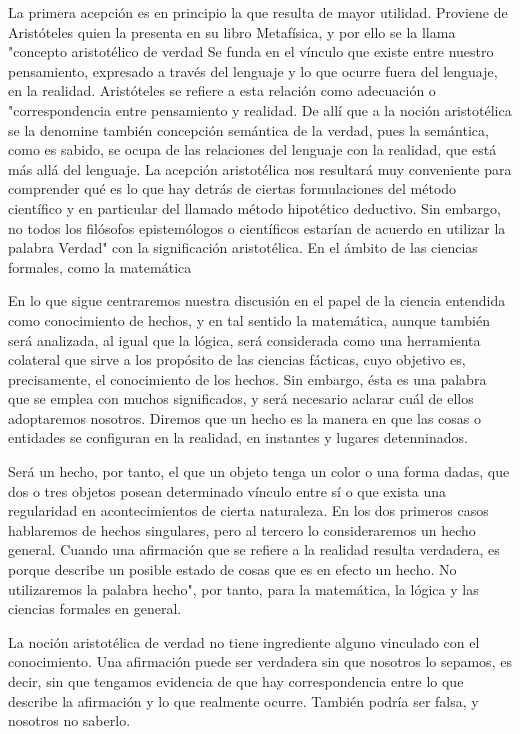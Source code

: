 \documentclass{article}
\begin{document}
La primera acepción es en principio la que resulta de mayor utilidad. Proviene de Aristóteles quien la presenta en su libro Metafísica, y por ello se la llama "concepto aristotélico de verdad Se funda en el vínculo que existe entre nuestro pensamiento, expresado a través del lenguaje y lo que ocurre fuera del lenguaje, en la realidad. Aristóteles se refiere a esta relación como adecuación o "correspondencia entre pensamiento y realidad. De allí que a la noción aristotélica se la denomine también concepción semántica de la verdad, pues la semántica, como es sabido, se ocupa de las relaciones del lenguaje con la realidad, que está más allá del lenguaje. La acepción aristotélica nos resultará muy conveniente para comprender qué es lo que hay detrás de ciertas formulaciones del método científico y en particular del llamado método hipotético deductivo. Sin embargo, no todos los filósofos epistemólogos o científicos estarían de acuerdo en utilizar la palabra Verdad" con la significación aristotélica. En el ámbito de las ciencias formales, como la matemática

En lo que sigue centraremos nuestra discusión en el papel de la ciencia entendida como conocimiento de hechos, y en tal sentido la matemática, aunque también será analizada, al igual que la lógica, será considerada como una herramienta colateral que sirve a los propósito de las ciencias fácticas, cuyo objetivo es, precisamente, el conocimiento de los hechos. Sin embargo, ésta es una palabra que se emplea con muchos significados, y será necesario aclarar cuál de ellos adoptaremos nosotros. 
Diremos que un hecho es la manera en que las cosas o entidades se configuran en la realidad, en instantes y lugares detenninados.

Será un hecho, por tanto, el que un objeto tenga un color o una forma dadas, que dos o tres objetos posean determinado vínculo entre sí o que exista una regularidad en acontecimientos de cierta naturaleza. En los dos primeros casos hablaremos de hechos singulares, pero al tercero lo consideraremos un hecho general. Cuando una afirmación que se refiere a la realidad resulta verdadera, es porque describe un posible estado de cosas que es en efecto un hecho. No utilizaremos la palabra hecho", por tanto, para la matemática, la lógica y las ciencias formales en general.

La noción aristotélica de verdad no tiene ingrediente alguno vinculado con el conocimiento. Una afirmación puede ser verdadera sin que nosotros lo sepamos, es decir, sin que tengamos evidencia de que hay correspondencia entre lo que describe la afirmación y lo que realmente ocurre. También podría ser falsa, y nosotros no saberlo.
\end{document}
